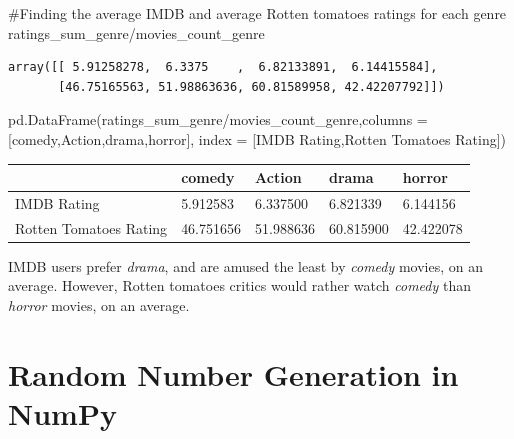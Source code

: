 \documentclass[
  letterpaper,
  DIV=11,
  numbers=noendperiod]{scrreprt}
\newenvironment{Shaded}{\begin{snugshade}}{\end{snugshade}}
\newcommand{\CommentTok}[1]{\textcolor[rgb]{0.37,0.37,0.37}{#1}}
\newcommand{\NormalTok}[1]{\textcolor[rgb]{0.00,0.23,0.31}{#1}}
\newcommand{\OperatorTok}[1]{\textcolor[rgb]{0.37,0.37,0.37}{#1}}
\newcommand{\StringTok}[1]{\textcolor[rgb]{0.13,0.47,0.30}{#1}}
\begin{document}
\begin{Shaded}
\begin{Highlighting}[]
\CommentTok{\#Finding the average IMDB and average Rotten tomatoes ratings for each genre}
\NormalTok{ratings\_sum\_genre}\OperatorTok{/}\NormalTok{movies\_count\_genre}
\end{Highlighting}
\end{Shaded}

\begin{verbatim}
array([[ 5.91258278,  6.3375    ,  6.82133891,  6.14415584],
       [46.75165563, 51.98863636, 60.81589958, 42.42207792]])
\end{verbatim}

\begin{Shaded}
\begin{Highlighting}[]
\NormalTok{pd.DataFrame(ratings\_sum\_genre}\OperatorTok{/}\NormalTok{movies\_count\_genre,columns }\OperatorTok{=}\NormalTok{ [}\StringTok{\textquotesingle{}comedy\textquotesingle{}}\NormalTok{,}\StringTok{\textquotesingle{}Action\textquotesingle{}}\NormalTok{,}\StringTok{\textquotesingle{}drama\textquotesingle{}}\NormalTok{,}\StringTok{\textquotesingle{}horror\textquotesingle{}}\NormalTok{],}
\NormalTok{             index }\OperatorTok{=}\NormalTok{ [}\StringTok{\textquotesingle{}IMDB Rating\textquotesingle{}}\NormalTok{,}\StringTok{\textquotesingle{}Rotten Tomatoes Rating\textquotesingle{}}\NormalTok{])}
\end{Highlighting}
\end{Shaded}

\begin{longtable}[]{@{}lllll@{}}
\toprule\noalign{}
& comedy & Action & drama & horror \\
\midrule\noalign{}
\endhead
\bottomrule\noalign{}
\endlastfoot
IMDB Rating & 5.912583 & 6.337500 & 6.821339 & 6.144156 \\
Rotten Tomatoes Rating & 46.751656 & 51.988636 & 60.815900 &
42.422078 \\
\end{longtable}

IMDB users prefer \emph{drama}, and are amused the least by
\emph{comedy} movies, on an average. However, Rotten tomatoes critics
would rather watch \emph{comedy} than \emph{horror} movies, on an
average.

\hypertarget{random-number-generation-in-numpy}{%
\section{Random Number Generation in
NumPy}\label{random-number-generation-in-numpy}}
\end{document}
